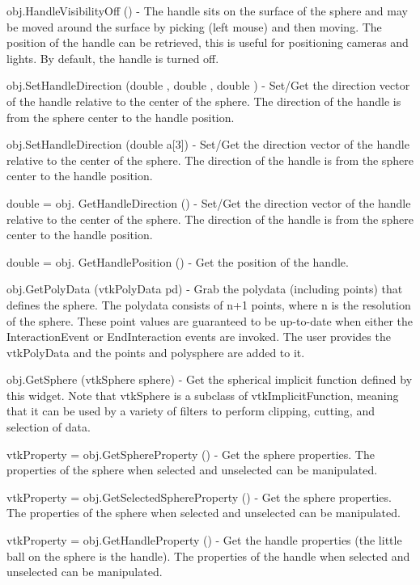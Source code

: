 \begin{DoxyItemize}
\item {\ttfamily obj.\-Handle\-Visibility\-Off ()} -\/ The handle sits on the surface of the sphere and may be moved around the surface by picking (left mouse) and then moving. The position of the handle can be retrieved, this is useful for positioning cameras and lights. By default, the handle is turned off.  
\item {\ttfamily obj.\-Set\-Handle\-Direction (double , double , double )} -\/ Set/\-Get the direction vector of the handle relative to the center of the sphere. The direction of the handle is from the sphere center to the handle position.  
\item {\ttfamily obj.\-Set\-Handle\-Direction (double a\mbox{[}3\mbox{]})} -\/ Set/\-Get the direction vector of the handle relative to the center of the sphere. The direction of the handle is from the sphere center to the handle position.  
\item {\ttfamily double = obj. Get\-Handle\-Direction ()} -\/ Set/\-Get the direction vector of the handle relative to the center of the sphere. The direction of the handle is from the sphere center to the handle position.  
\item {\ttfamily double = obj. Get\-Handle\-Position ()} -\/ Get the position of the handle.  
\item {\ttfamily obj.\-Get\-Poly\-Data (vtk\-Poly\-Data pd)} -\/ Grab the polydata (including points) that defines the sphere. The polydata consists of n+1 points, where n is the resolution of the sphere. These point values are guaranteed to be up-\/to-\/date when either the Interaction\-Event or End\-Interaction events are invoked. The user provides the vtk\-Poly\-Data and the points and polysphere are added to it.  
\item {\ttfamily obj.\-Get\-Sphere (vtk\-Sphere sphere)} -\/ Get the spherical implicit function defined by this widget. Note that vtk\-Sphere is a subclass of vtk\-Implicit\-Function, meaning that it can be used by a variety of filters to perform clipping, cutting, and selection of data.  
\item {\ttfamily vtk\-Property = obj.\-Get\-Sphere\-Property ()} -\/ Get the sphere properties. The properties of the sphere when selected and unselected can be manipulated.  
\item {\ttfamily vtk\-Property = obj.\-Get\-Selected\-Sphere\-Property ()} -\/ Get the sphere properties. The properties of the sphere when selected and unselected can be manipulated.  
\item {\ttfamily vtk\-Property = obj.\-Get\-Handle\-Property ()} -\/ Get the handle properties (the little ball on the sphere is the handle). The properties of the handle when selected and unselected can be manipulated.  

\end{DoxyItemize}
